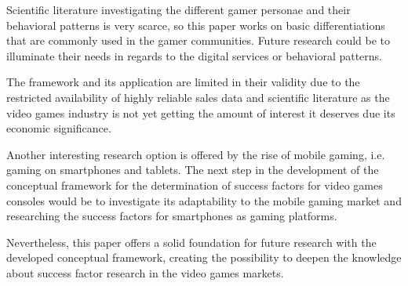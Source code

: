 \documentclass
[
    a4paper,
    11pt
]
{article}
\begin{document}
Scientific literature investigating the different gamer
personae and their behavioral patterns is very scarce, so this paper works on basic
differentiations that are commonly used in the gamer communities. Future research
could be to illuminate their needs in regards to the digital services or
behavioral patterns.

The framework and its application are limited in their validity due to the
restricted availability of highly reliable sales data and scientific literature
as the video games industry is not yet getting the amount of interest it
deserves due its economic significance.

Another interesting research option is offered by the rise of mobile gaming,
i.e. gaming on smartphones and tablets. The next step in the development of
the conceptual framework for the determination of success factors for
video games consoles would be to investigate its adaptability to the
mobile gaming market and researching the success factors for smartphones
as gaming platforms.

Nevertheless, this paper offers a solid foundation for future research
with the developed conceptual framework, creating the possibility to
deepen the knowledge about success factor research in the video games markets.
\end{document}
